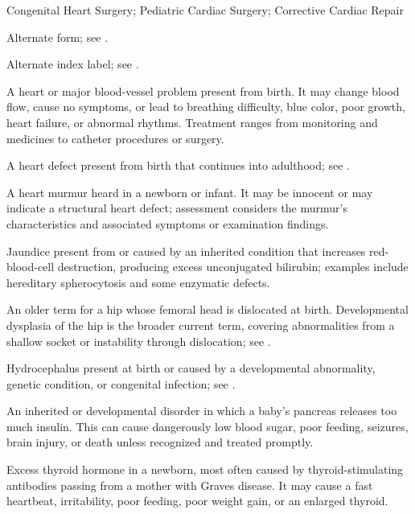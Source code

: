\synonyms
Congenital Heart Surgery; Pediatric Cardiac Surgery; Corrective Cardiac Repair

 Alternate form; see .

 Alternate index label; see .

 A heart or major blood-vessel problem present from birth. It may change blood flow, cause no symptoms, or lead to breathing difficulty, blue color, poor growth, heart failure, or abnormal rhythms. Treatment ranges from monitoring and medicines to catheter procedures or surgery.

 A heart defect present from birth that continues into adulthood; see .

 A heart murmur heard in a newborn or infant. It may be innocent or may indicate a
structural heart defect; assessment considers the murmur's characteristics and associated symptoms or examination
findings.

 Jaundice present from or caused by an inherited condition that increases red-blood-cell destruction, producing excess unconjugated bilirubin; examples include hereditary spherocytosis and some enzymatic defects.

 An older term for a hip whose femoral head is
dislocated at birth. Developmental dysplasia of the hip is the broader current term,
covering abnormalities from a shallow socket or instability through dislocation; see
.

 Hydrocephalus present at birth or caused by a developmental abnormality, genetic condition, or congenital infection; see .

 An inherited or developmental disorder in which a baby's pancreas releases too much insulin. This can cause dangerously low blood sugar, poor feeding, seizures, brain injury, or death unless recognized and treated promptly.

 Excess thyroid hormone in a newborn, most often caused by thyroid-stimulating antibodies passing from a mother with Graves disease. It may cause a fast heartbeat, irritability, poor feeding, poor weight gain, or an enlarged thyroid.

